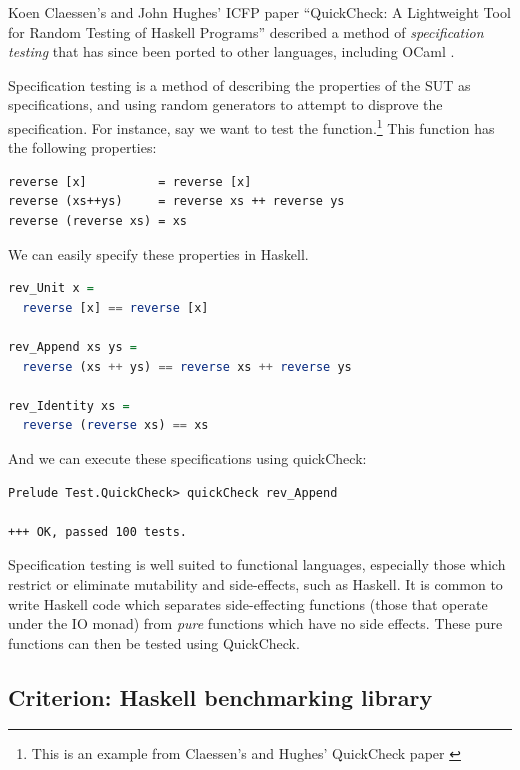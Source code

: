 Koen Claessen's and John Hughes' ICFP paper ``QuickCheck: A
Lightweight Tool for Random Testing of Haskell Programs''
\cite{claessen:quickcheck} described a method of \textit{specification
  testing} that has since been ported to other languages, including
OCaml \cite{code:ocaml-quickcheck} \cite{www:kaputt}.

Specification testing is a method of describing the properties of the
SUT as specifications, and using random generators to attempt to
disprove the specification. For instance, say we want to test the
 function.\footnote{This is an example from Claessen's
  and Hughes' QuickCheck paper \cite{claessen:quickcheck}} This
function has the following properties:

\footnotesize
\begin{verbatim}
reverse [x]          = reverse [x]
reverse (xs++ys)     = reverse xs ++ reverse ys
reverse (reverse xs) = xs
\end{verbatim}
\normalsize

We can easily specify these properties in Haskell.

\begin{lstlisting}[language=Haskell]
rev_Unit x =
  reverse [x] == reverse [x]

rev_Append xs ys =
  reverse (xs ++ ys) == reverse xs ++ reverse ys

rev_Identity xs =
  reverse (reverse xs) == xs
\end{lstlisting}

And we can execute these specifications using quickCheck:

\footnotesize
\begin{verbatim}
Prelude Test.QuickCheck> quickCheck rev_Append

+++ OK, passed 100 tests.
\end{verbatim}
\normalsize

Specification testing is well suited to functional languages,
especially those which restrict or eliminate mutability and
side-effects, such as Haskell. It is common to write Haskell code
which separates side-effecting functions (those that operate under the
IO monad) from \textit{pure} functions which have no side
effects. These pure functions can then be tested using QuickCheck. 

\subsection{Criterion: Haskell benchmarking library}

